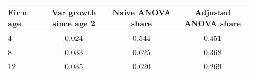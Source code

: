 \begin{tabular}{lccc}
Firm age & Var  growth since age 2 & Naive ANOVA share & Adjusted ANOVA share \\
\hline
4 &     0.024 &  0.544 &  0.451 \\
8 &     0.033 &  0.625 &  0.368 \\
12 &     0.035 &  0.620 &  0.269 \\
\end{tabular}
